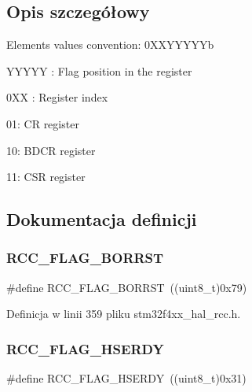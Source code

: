 \subsection{Opis szczegółowy}
Elements values convention\+: 0\+X\+X\+Y\+Y\+Y\+Y\+Yb
\begin{DoxyItemize}
\item Y\+Y\+Y\+YY \+: Flag position in the register
\item 0\+XX \+: Register index
\begin{DoxyItemize}
\item 01\+: CR register
\item 10\+: B\+D\+CR register
\item 11\+: C\+SR register 
\end{DoxyItemize}
\end{DoxyItemize}

\subsection{Dokumentacja definicji}
\mbox{\label{group___r_c_c___flag_ga23d5211abcdf0e397442ca534ca04bb4}} 
\subsubsection{\texorpdfstring{R\+C\+C\+\_\+\+F\+L\+A\+G\+\_\+\+B\+O\+R\+R\+ST}{RCC\_FLAG\_BORRST}}
{\footnotesize\ttfamily \#define R\+C\+C\+\_\+\+F\+L\+A\+G\+\_\+\+B\+O\+R\+R\+ST~((uint8\+\_\+t)0x79)}



Definicja w linii 359 pliku stm32f4xx\+\_\+hal\+\_\+rcc.\+h.

\mbox{\label{group___r_c_c___flag_ga173edf47bec93cf269a0e8d0fec9997c}} 
\subsubsection{\texorpdfstring{R\+C\+C\+\_\+\+F\+L\+A\+G\+\_\+\+H\+S\+E\+R\+DY}{RCC\_FLAG\_HSERDY}}
{\footnotesize\ttfamily \#define R\+C\+C\+\_\+\+F\+L\+A\+G\+\_\+\+H\+S\+E\+R\+DY~((uint8\+\_\+t)0x31)}



